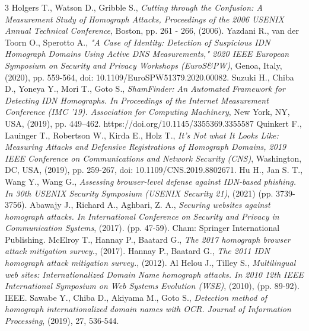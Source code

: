 \begin{thebibliography}{3}
   Holgers T., Watson D., Gribble S.,
   \textit{Cutting through the Confusion: A Measurement Study of Homograph Attacks, Proceedings of the 2006 USENIX Annual Technical Conference}, Boston, pp. 261 - 266, (2006).
    Yazdani R., van der Toorn O., Sperotto A., \textit{"A Case of Identity: Detection of Suspicious IDN Homograph Domains Using Active DNS Measurements," 2020 IEEE European Symposium on Security and Privacy Workshops (EuroS\&PW)}, Genoa, Italy, (2020), pp. 559-564, doi: 10.1109/EuroSPW51379.2020.00082.
    Suzuki H., Chiba D., Yoneya Y., Mori T., Goto S., \textit{ShamFinder: An Automated Framework for Detecting IDN Homographs. In Proceedings of the Internet Measurement Conference (IMC '19). Association for Computing Machinery}, New York, NY, USA, (2019), pp. 449–462. https://doi.org/10.1145/3355369.3355587
    Quinkert F., Lauinger T., Robertson W., Kirda E., Holz T., \textit{It's Not what It Looks Like: Measuring Attacks and Defensive Registrations of Homograph Domains, 2019 IEEE Conference on Communications and Network Security (CNS)}, Washington, DC, USA, (2019), pp. 259-267, doi: 10.1109/CNS.2019.8802671.
    Hu H., Jan S. T., Wang Y., Wang G., \textit{Assessing browser-level defense against {IDN-based} phishing. In 30th USENIX Security Symposium (USENIX Security 21)}, (2021) (pp. 3739-3756).
    Abawajy J., Richard A., Aghbari, Z. A., \textit{Securing websites against homograph attacks. In International Conference on Security and Privacy in Communication Systems}, (2017). (pp. 47-59). Cham: Springer International Publishing.
    McElroy T., Hannay P., Baatard G., \textit{The 2017 homograph browser attack mitigation survey.}, (2017).
    Hannay P., Baatard G., \textit{The 2011 IDN homograph attack mitigation survey.}, (2012).
    Al Helou J., Tilley S., \textit{Multilingual web sites: Internationalized Domain Name homograph attacks. In 2010 12th IEEE International Symposium on Web Systems Evolution (WSE)}, (2010), (pp. 89-92). IEEE.
    Sawabe Y., Chiba D., Akiyama M., Goto S., \textit{Detection method of homograph internationalized domain names with OCR. Journal of Information Processing},  (2019), 27, 536-544.
\end{thebibliography}
